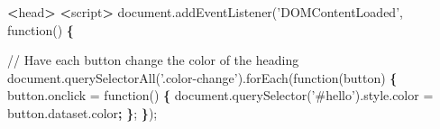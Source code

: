 \documentclass[]{book}
\newenvironment{Shaded}{\begin{snugshade}}{\end{snugshade}}
\newcommand{\KeywordTok}[1]{\textcolor[rgb]{0.13,0.29,0.53}{\textbf{#1}}}
\newcommand{\StringTok}[1]{\textcolor[rgb]{0.31,0.60,0.02}{#1}}
\newcommand{\FunctionTok}[1]{\textcolor[rgb]{0.00,0.00,0.00}{#1}}
\newcommand{\OperatorTok}[1]{\textcolor[rgb]{0.81,0.36,0.00}{\textbf{#1}}}
\newcommand{\ExtensionTok}[1]{#1}
\newcommand{\NormalTok}[1]{#1}
\begin{document}
\begin{Shaded}
\begin{Highlighting}[]
\OperatorTok{<}\FunctionTok{head}\OperatorTok{>}                                                                                  
    \OperatorTok{<}\ExtensionTok{script}\OperatorTok{>}                                                                            
        \ExtensionTok{document.addEventListener}\NormalTok{(}\StringTok{'DOMContentLoaded'}\NormalTok{, function() }\KeywordTok{\{}                      
                                                                                        
            \ExtensionTok{//}\NormalTok{ Have each button change the color of the heading                         }
            \ExtensionTok{document.querySelectorAll}\NormalTok{(}\StringTok{'.color-change'}\NormalTok{)}\ExtensionTok{.forEach}\NormalTok{(function(button) }\KeywordTok{\{}       
                \ExtensionTok{button.onclick}\NormalTok{ = function() }\KeywordTok{\{}                                           
                    \ExtensionTok{document.querySelector}\NormalTok{(}\StringTok{'#hello'}\NormalTok{)}\ExtensionTok{.style.color}\NormalTok{ = button.dataset.color}\KeywordTok{;}
                \KeywordTok{\}}\NormalTok{;                                                                      }
            \KeywordTok{\}}\NormalTok{);                                                                         }
                                                                                        

\end{Highlighting}
\end{Shaded}
\end{document}
